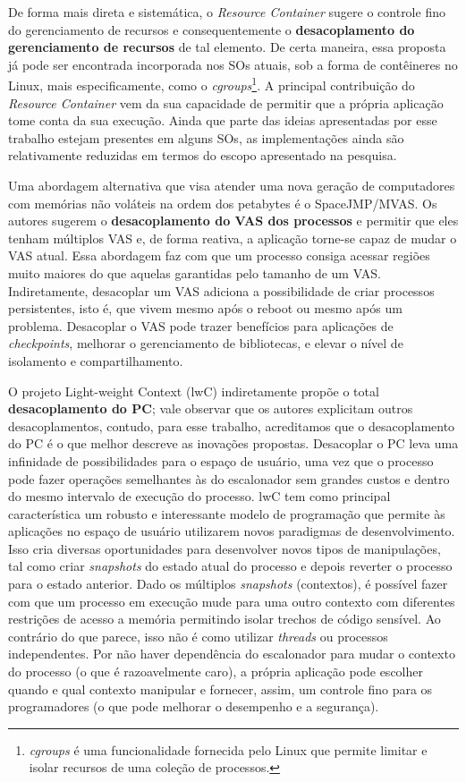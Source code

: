 De forma mais direta e sistemática, o \textit{Resource Container} sugere o
controle fino do gerenciamento de recursos e consequentemente o
\textbf{desacoplamento do gerenciamento de recursos} de tal elemento. De certa
maneira, essa proposta já pode ser encontrada incorporada nos SOs atuais, sob a
forma de contêineres no Linux, mais especificamente, como o
\textit{cgroups}\footnote{\emph{cgroups} é uma funcionalidade fornecida pelo
Linux que permite limitar e isolar recursos de uma coleção de processos.}. A
principal contribuição do \emph{Resource Container} vem da sua capacidade de permitir que a
própria aplicação tome conta da sua execução.  Ainda que parte das ideias
apresentadas por esse trabalho estejam presentes em alguns SOs, as
implementações ainda são relativamente reduzidas em termos do escopo
apresentado na pesquisa.

Uma abordagem alternativa que visa atender uma nova geração de computadores com
memórias não voláteis na ordem dos petabytes é o SpaceJMP/MVAS.  Os autores
sugerem o \textbf{desacoplamento do VAS dos processos} e permitir que eles tenham
múltiplos VAS e, de forma reativa, a aplicação torne-se capaz de mudar o VAS
atual. Essa abordagem faz com que um processo consiga acessar regiões muito
maiores do que aquelas garantidas pelo tamanho de um VAS. Indiretamente,
desacoplar um VAS adiciona a possibilidade de criar processos persistentes,
isto é, que vivem mesmo após o reboot ou mesmo após um problema. Desacoplar o VAS
pode trazer benefícios para aplicações de \textit{checkpoints}, melhorar o
gerenciamento de bibliotecas, e elevar o nível de isolamento e compartilhamento.

O projeto  Light-weight Context (lwC) indiretamente propõe o total
\textbf{desacoplamento do PC}; vale observar que os autores explicitam outros
desacoplamentos, contudo, para esse trabalho, acreditamos que o desacoplamento
do PC é o que melhor descreve as inovações propostas. Desacoplar o PC leva uma
infinidade de possibilidades para o espaço de usuário, uma vez que o processo
pode fazer operações semelhantes às do escalonador sem grandes custos e dentro
do mesmo intervalo de execução do processo. lwC tem como principal
característica um robusto e interessante modelo de programação que permite
às aplicações no espaço de usuário utilizarem novos paradigmas de desenvolvimento.
Isso cria diversas oportunidades para desenvolver novos tipos de manipulações,
tal como criar \emph{snapshots} do estado atual do processo e depois reverter o
processo para o estado anterior. Dado os múltiplos \emph{snapshots}
(contextos), é possível fazer com que um processo em execução mude para uma
outro contexto com diferentes restrições de acesso a memória permitindo isolar
trechos de código sensível.  Ao contrário do que parece, isso não é como
utilizar \emph{threads} ou processos independentes. Por não haver dependência
do escalonador para mudar o contexto do processo (o que é razoavelmente caro),
a própria aplicação pode escolher quando e qual contexto manipular e fornecer,
assim, um controle fino para os programadores (o que pode melhorar o desempenho
e a segurança).

